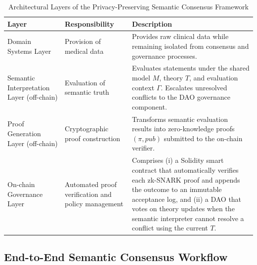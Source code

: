 \documentclass[journal]{IEEEtran}
\begin{document}
\begin{table}[tb]
\centering
\caption{Architectural Layers of the Privacy-Preserving Semantic Consensus Framework}
\label{tab:architecture_layers}
\small
\begin{tabular}{p{3.5cm}p{3.5cm}p{9.5cm}}
\toprule
\textbf{Layer} & \textbf{Responsibility} & \textbf{Description} \\
\midrule
Domain Systems Layer &
Provision of medical data &
Provides raw clinical data while remaining isolated from consensus and governance processes. \\
\addlinespace
Semantic Interpretation Layer (off-chain) &
Evaluation of semantic truth &
Evaluates statements under the shared model $M$, theory $T$, and evaluation context $\Gamma$. Escalates unresolved conflicts to the DAO governance component. \\
\addlinespace
Proof Generation Layer (off-chain) &
Cryptographic proof construction &
Transforms semantic evaluation results into zero-knowledge proofs $(\pi,\mathit{pub})$ submitted to the on-chain verifier. \\
\addlinespace
On-chain Governance Layer &
Automated proof verification and policy management &
Comprises (i) a Solidity smart contract that automatically verifies each zk-SNARK proof and appends the outcome to an immutable acceptance log, and (ii) a DAO that votes on theory updates when the semantic interpreter cannot resolve a conflict using the current $T$. \\
\bottomrule
\end{tabular}
\end{table}


\subsection{End-to-End Semantic Consensus Workflow}
\label{sec:workflow}
\end{document}
